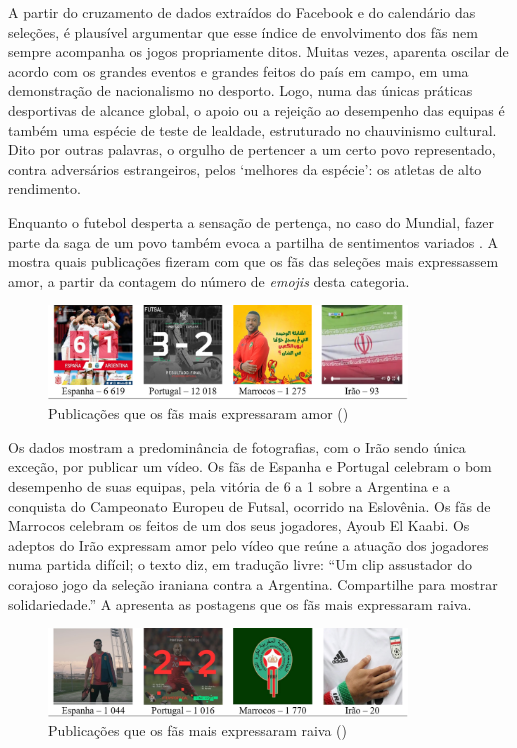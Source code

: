 \documentclass{textolivre}
\begin{document}
A partir do cruzamento de dados extraídos do Facebook e do calendário das seleções, é plausível argumentar que esse índice de envolvimento dos fãs nem sempre acompanha os jogos propriamente ditos. Muitas vezes, aparenta oscilar de acordo com os grandes eventos e grandes feitos do país em campo, em uma demonstração de nacionalismo no desporto. Logo, numa das únicas práticas desportivas de alcance global, o apoio ou a rejeição ao desempenho das equipas é também uma espécie de teste de lealdade, estruturado no chauvinismo cultural. Dito por outras palavras, o orgulho de pertencer a um certo povo representado, contra adversários estrangeiros, pelos ‘melhores da espécie’: os atletas de alto rendimento.

Enquanto o futebol desperta a sensação de pertença, no caso do Mundial, fazer parte da saga de um povo também evoca a partilha de sentimentos variados \cite{dorsey2016}. A  mostra quais publicações fizeram com que os fãs das seleções mais expressassem amor, a partir da contagem do número de \emph{emojis} desta categoria.

\begin{figure}[htbp]
 \centering
 \includegraphics[width=0.85\textwidth]{figure05.png}
 \caption{Publicações que os fãs mais expressaram amor ({})}
 \label{fig5}
\end{figure}

Os dados mostram a predominância de fotografias, com o Irão sendo única exceção, por publicar um vídeo. Os fãs de Espanha e Portugal celebram o bom desempenho de suas equipas, pela vitória de 6 a 1 sobre a Argentina e a conquista do Campeonato Europeu de Futsal, ocorrido na Eslovênia. Os fãs de Marrocos celebram os feitos de um dos seus jogadores, Ayoub El Kaabi. Os adeptos do Irão expressam amor pelo vídeo que reúne a atuação dos jogadores numa partida difícil; o texto diz, em tradução livre: “Um clip assustador do corajoso jogo da seleção iraniana contra a Argentina. Compartilhe para mostrar solidariedade.” A  apresenta as postagens que os fãs mais expressaram raiva.

\begin{figure}[htbp]
 \centering
 \includegraphics[width=0.85\textwidth]{figure06.png}
 \caption{Publicações que os fãs mais expressaram raiva ({})}
 \label{fig6}
\end{figure}
\end{document}
